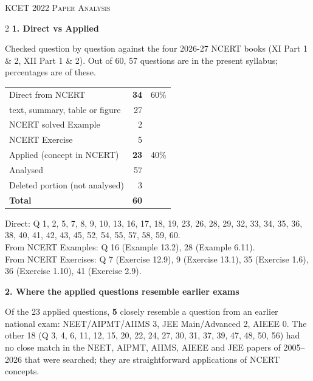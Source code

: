 \clearpage
\begin{center}{}\par
{\fontsize{20}{24}\selectfont\color{navy}\scshape KCET 2022 \textperiodcentered{} Paper Analysis}\par
{\color{gilt}}\end{center}
\vspace{4pt}
\begin{multicols}{2}
\textbf{\color{crimson}1. Direct vs Applied}\par\smallskip
{\footnotesize Checked question by question against the four 2026-27 NCERT books (XI Part 1 \& 2, XII Part 1 \& 2). Out of 60, 57 questions are in the present syllabus; percentages are of these.}\par\smallskip
\begin{tabular}{@{}lrr@{}}\toprule
Direct from NCERT & \textbf{34} & 60\%\\
\quad text, summary, table or figure & 27 &\\
\quad NCERT solved Example & 2 &\\
\quad NCERT Exercise & 5 &\\
Applied (concept in NCERT) & \textbf{23} & 40\%\\\midrule
Analysed & 57 &\\
Deleted portion (not analysed) & 3 &\\\midrule
\textbf{Total} & \textbf{60} &\\\bottomrule\end{tabular}\par\smallskip
{\footnotesize Direct: Q 1, 2, 5, 7, 8, 9, 10, 13, 16, 17, 18, 19, 23, 26, 28, 29, 32, 33, 34, 35, 36, 38, 40, 41, 42, 43, 45, 52, 54, 55, 57, 58, 59, 60.\\ From NCERT Examples: Q 16 (Example 13.2), 28 (Example 6.11).\\ From NCERT Exercises: Q 7 (Exercise 12.9), 9 (Exercise 13.1), 35 (Exercise 1.6), 36 (Exercise 1.10), 41 (Exercise 2.9).}\par\medskip
\textbf{\color{crimson}2. Where the applied questions resemble earlier exams}\par\smallskip
Of the 23 applied questions, \textbf{5} closely resemble a question from an earlier national exam:
NEET/AIPMT/AIIMS 3, JEE Main/Advanced 2, AIEEE 0. The other 18 (Q 3, 4, 6, 11, 12, 15, 20, 22, 24, 27, 30, 31, 37, 39, 47, 48, 50, 56) had no close match in the NEET, AIPMT, AIIMS, AIEEE and JEE papers of 2005--2026 that were searched; they are straightforward applications of NCERT concepts.\par

\end{multicols}
